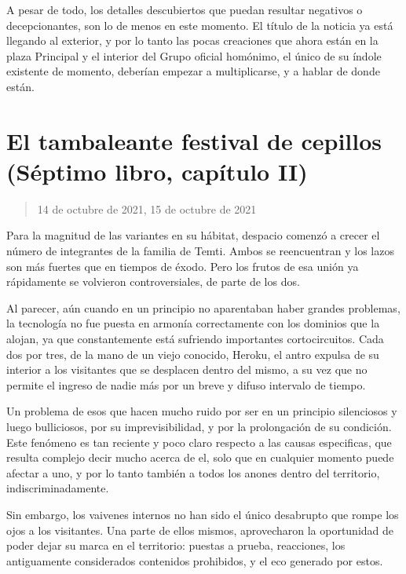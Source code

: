 \documentclass[
  spanish,
]{book}
\begin{document}
A pesar de todo, los detalles descubiertos que puedan resultar negativos o decepcionantes, son lo de menos en este momento. El título de la noticia ya está llegando al exterior, y por lo tanto las pocas creaciones que ahora están en la plaza Principal y el interior del Grupo oficial homónimo, el único de su índole existente de momento, deberían empezar a multiplicarse, y a hablar de donde están.

\hypertarget{el-tambaleante-festival-de-cepillos-suxe9ptimo-libro-capuxedtulo-ii}{%
\section{El tambaleante festival de cepillos (Séptimo libro, capítulo II)}\label{el-tambaleante-festival-de-cepillos-suxe9ptimo-libro-capuxedtulo-ii}}

\begin{quote}
14 de octubre de 2021, 15 de octubre de 2021
\end{quote}

Para la magnitud de las variantes en su hábitat, despacio comenzó a crecer el número de integrantes de la familia de Temti. Ambos se reencuentran y los lazos son más fuertes que en tiempos de éxodo. Pero los frutos de esa unión ya rápidamente se volvieron controversiales, de parte de los dos.

Al parecer, aún cuando en un principio no aparentaban haber grandes problemas, la tecnología no fue puesta en armonía correctamente con los dominios que la alojan, ya que constantemente está sufriendo importantes cortocircuitos. Cada dos por tres, de la mano de un viejo conocido, Heroku, el antro expulsa de su interior a los visitantes que se desplacen dentro del mismo, a su vez que no permite el ingreso de nadie más por un breve y difuso intervalo de tiempo.

Un problema de esos que hacen mucho ruido por ser en un principio silenciosos y luego bulliciosos, por su imprevisibilidad, y por la prolongación de su condición. Este fenómeno es tan reciente y poco claro respecto a las causas especificas, que resulta complejo decir mucho acerca de el, solo que en cualquier momento puede afectar a uno, y por lo tanto también a todos los anones dentro del territorio, indiscriminadamente.

Sin embargo, los vaivenes internos no han sido el único desabrupto que rompe los ojos a los visitantes. Una parte de ellos mismos, aprovecharon la oportunidad de poder dejar su marca en el territorio: puestas a prueba, reacciones, los antiguamente considerados contenidos prohibidos, y el eco generado por estos.
\end{document}
